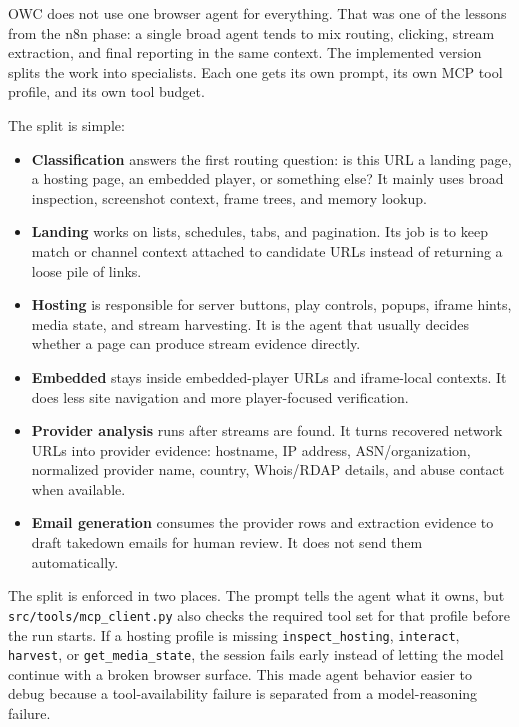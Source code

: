 OWC does not use one browser agent for everything. That was one of the lessons from the
n8n phase: a single broad agent tends to mix routing, clicking, stream extraction, and
final reporting in the same context. The implemented version splits the work into
specialists. Each one gets its own prompt, its own MCP tool profile, and its own tool
budget.

The split is simple:
\begin{itemize}
  \item \textbf{Classification} answers the first routing question: is this URL a landing
  page, a hosting page, an embedded player, or something else? It mainly uses broad
  inspection, screenshot context, frame trees, and memory lookup.
  \item \textbf{Landing} works on lists, schedules, tabs, and pagination. Its job is to
  keep match or channel context attached to candidate URLs instead of returning a loose
  pile of links.
  \item \textbf{Hosting} is responsible for server buttons, play controls, popups,
  iframe hints, media state, and stream harvesting. It is the agent that usually decides
  whether a page can produce stream evidence directly.
  \item \textbf{Embedded} stays inside embedded-player URLs and iframe-local contexts. It
  does less site navigation and more player-focused verification.
  \item \textbf{Provider analysis} runs after streams are found. It turns recovered
  network URLs into provider evidence: hostname, IP address, ASN/organization, normalized
  provider name, country, Whois/RDAP details, and abuse contact when available.
  \item \textbf{Email generation} consumes the provider rows and extraction evidence to
  draft takedown emails for human review. It does not send them automatically.
\end{itemize}

The split is enforced in two places. The prompt tells the agent what it owns, but
\texttt{src/tools/mcp\_client.py} also checks the required tool set for that profile
before the run starts. If a hosting profile is missing \texttt{inspect\_hosting},
\texttt{interact}, \texttt{harvest}, or \texttt{get\_media\_state}, the session fails
early instead of letting the model continue with a broken browser surface. This made
agent behavior easier to debug because a tool-availability failure is separated from a
model-reasoning failure.

